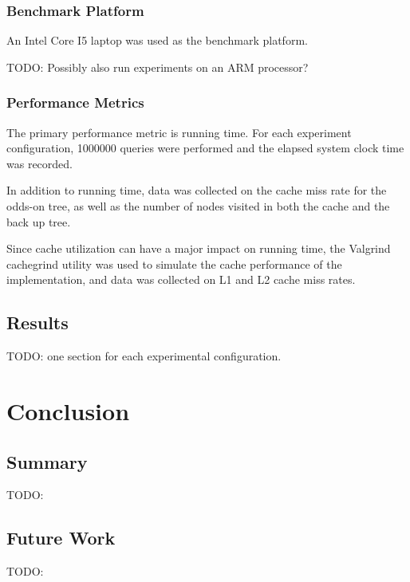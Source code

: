 \documentclass[mcs]{scsthesis}
\begin{document}
\subsection{Benchmark Platform}

An Intel Core I5 laptop was used as the benchmark platform.

TODO: Possibly also run experiments on an ARM processor?

\subsection{Performance Metrics}

The primary performance metric is running time.  For each experiment
configuration, 1000000 queries were performed and the elapsed system clock
time was recorded.

In addition to running time, data was collected on the cache miss rate for the
odds-on tree, as well as the number of nodes visited in both the cache and the
back up tree.

Since cache utilization can have a major impact on running time, the Valgrind
\cite{valgrind} cachegrind utility was used to simulate the cache performance
of the implementation, and data was collected on L1 and L2 cache miss rates.

\section{Results}

TODO: one section for each experimental configuration.

\chapter{Conclusion}

\section{Summary}

TODO:

\section{Future Work}

TODO:
\end{document}
